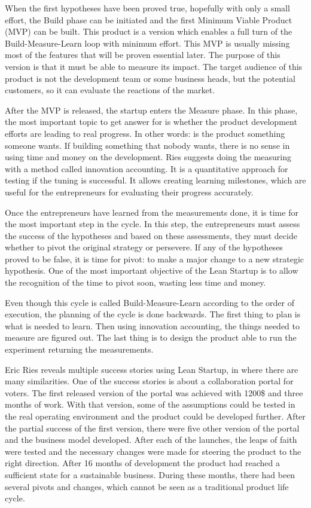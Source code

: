 When the first hypotheses have been proved true, hopefully with only a small effort, the Build phase can be initiated and the first Minimum Viable Product (MVP) can be built. This product is a version which enables a full turn of the Build-Measure-Learn loop with minimum effort. This MVP is usually missing most of the features that will be proven essential later. The purpose of this version is that it must be able to measure its impact. The target audience of this product is not the development team or some business heads, but the potential customers, so it can evaluate the reactions of the market.

After the MVP is released, the startup enters the Measure phase. In this phase, the most important topic to get answer for is whether the product development efforts are leading to real progress. In other words: is the product something someone wants. If building something that nobody wants, there is no sense in using time and money on the development. Ries suggests doing the measuring with a method called innovation accounting. It is a quantitative approach for testing if the tuning is successful. It allows creating learning milestones, which are useful for the entrepreneurs for evaluating their progress accurately.

Once the entrepreneurs have learned from the measurements done, it is time for the most important step in the cycle. In this step, the entrepreneurs must assess the success of the hypotheses and based on these assessments, they must decide whether to pivot the original strategy or persevere. If any of the hypotheses proved to be false, it is time for pivot: to make a major change to a new strategic hypothesis. One of the most important objective of the Lean Startup is to allow the recognition of the time to pivot soon, wasting less time and money.

Even though this cycle is called Build-Measure-Learn according to the order of execution, the planning of the cycle is done backwards. The first thing to plan is what is needed to learn. Then using innovation accounting, the things needed to measure are figured out. The last thing is to design the product able to run the experiment returning the measurements.

 Eric Ries reveals multiple success stories using Lean Startup, in where there are many similarities. One of the success stories is about a collaboration portal for voters. The first released version of the portal was achieved with 1200\$ and three months of work. With that version, some of the assumptions could be tested in the real operating environment and the product could be developed further. After the partial success of the first version, there were five other version of the portal and the business model developed. After each of the launches, the leaps of faith were tested and the necessary changes were made for steering the product to the right direction. After 16 months of development the product had reached a sufficient state for a sustainable business. During these months, there had been several pivots and changes, which cannot be seen as a traditional product life cycle.



